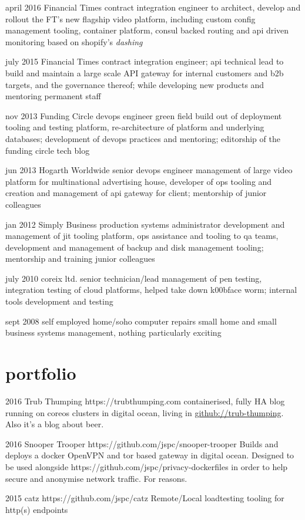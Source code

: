 \documentclass[]{friggeri-cv}
\begin{document}
\begin{entrylist}

\entry
{april 2016}
{Financial Times}
{contract integration engineer}
{to architect, develop and rollout the FT's new flagship video platform, including custom config management tooling, container platform, consul backed routing and api driven monitoring based on shopify's \emph{dashing}}

\entry
{july 2015}
{Financial Times}
{contract integration engineer; api technical lead}
{to build and maintain a large scale API gateway for internal customers and b2b targets, and the governance thereof; while developing new products and mentoring permanent staff}

\entry
{nov 2013}
{Funding Circle}
{devops engineer}
{green field build out of deployment tooling and testing platform, re-architecture of platform and underlying databases; development of devops practices and mentoring; editorship of the funding circle tech blog}

\entry
{jun 2013}
{Hogarth Worldwide}
{senior devops engineer}
{management of large video platform for multinational advertising house, developer of ops tooling and creation and management of api gateway for client; mentorship of junior colleagues}

\entry
{jan 2012}
{Simply Business}
{production systems administrator}
{development and management of jit tooling platform, ops assistance and tooling to qa teams, development and management of backup and disk management tooling; mentorship and training junior colleagues}

\entry
{july 2010}
{coreix ltd.}
{senior technician/lead}
{management of pen testing, integration testing of cloud platforms, helped take down k00bface worm; internal tools development and testing}

\entry
{sept 2008}
{self employed}
{home/soho computer repairs}
{small home and small business systems management, nothing particularly exciting}


\end{entrylist}

\section{portfolio}

\begin{entrylist}

\entry
{2016}
{Trub Thumping}
{https://trubthumping.com}
{containerised, fully HA blog running on coreos clusters in digital ocean, living in \href{https://github.com/trub-thumping}{github://trub-thumping}. Also it's a blog about beer.}

\entry
{2016}
{Snooper Trooper}
{https://github.com/jspc/snooper-trooper}
{Builds and deploys a docker OpenVPN and tor based gateway in digital ocean. Designed to be used alongside https://github.com/jspc/privacy-dockerfiles in order to help secure and anonymise network traffic. For reasons.}

\entry
{2015}
{catz}
{https://github.com/jspc/catz}
{Remote/Local loadtesting tooling for http(s) endpoints}

\end{entrylist}
\end{document}
